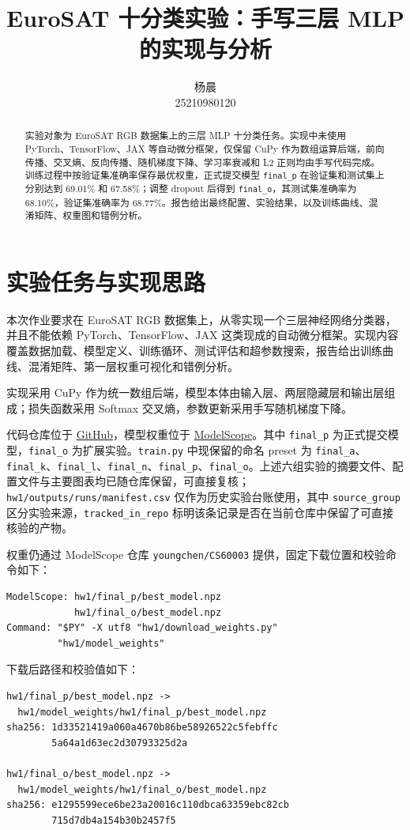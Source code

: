\documentclass[lang=cn,a4paper,newtx,code=minted]{elegantpaper}
\title{EuroSAT 十分类实验：手写三层 MLP 的实现与分析}
\author{杨晨 \\ 25210980120}
\institute{\href{https://github.com/YangChen-pro/CS60003}{GitHub 仓库}\quad|\quad\href{https://modelscope.cn/models/youngchen/CS60003/}{ModelScope 权重}}
\date{\zhdate{2026/04/18}}
\begin{document}
\maketitle

\begin{abstract}
实验对象为 EuroSAT RGB 数据集上的三层 MLP 十分类任务。实现中未使用 PyTorch、TensorFlow、JAX 等自动微分框架，仅保留 CuPy 作为数组运算后端，前向传播、交叉熵、反向传播、随机梯度下降、学习率衰减和 L2 正则均由手写代码完成。训练过程中按验证集准确率保存最优权重，正式提交模型 \texttt{final\_p} 在验证集和测试集上分别达到 69.01\% 和 67.58\%；调整 dropout 后得到 \texttt{final\_o}，其测试集准确率为 68.10\%，验证集准确率为 68.77\%。报告给出最终配置、实验结果，以及训练曲线、混淆矩阵、权重图和错例分析。
\end{abstract}

\section{实验任务与实现思路}

本次作业要求在 EuroSAT RGB 数据集上，从零实现一个三层神经网络分类器，并且不能依赖 PyTorch、TensorFlow、JAX 这类现成的自动微分框架。实现内容覆盖数据加载、模型定义、训练循环、测试评估和超参数搜索，报告给出训练曲线、混淆矩阵、第一层权重可视化和错例分析。

实现采用 CuPy 作为统一数组后端，模型本体由输入层、两层隐藏层和输出层组成；损失函数采用 Softmax 交叉熵，参数更新采用手写随机梯度下降。

代码仓库位于 \href{https://github.com/YangChen-pro/CS60003}{GitHub}，模型权重位于 \href{https://modelscope.cn/models/youngchen/CS60003/}{ModelScope}。其中 \texttt{final\_p} 为正式提交模型，\texttt{final\_o} 为扩展实验。\texttt{train.py} 中现保留的命名 preset 为 \texttt{final\_a}、\texttt{final\_k}、\texttt{final\_l}、\texttt{final\_n}、\texttt{final\_p}、\texttt{final\_o}。上述六组实验的摘要文件、配置文件与主要图表均已随仓库保留，可直接复核；\nolinkurl{hw1/outputs/runs/manifest.csv} 仅作为历史实验台账使用，其中 \texttt{source\_group} 区分实验来源，\texttt{tracked\_in\_repo} 标明该条记录是否在当前仓库中保留了可直接核验的产物。

权重仍通过 ModelScope 仓库 \texttt{youngchen/CS60003} 提供，固定下载位置和校验命令如下：
\begin{verbatim}
ModelScope: hw1/final_p/best_model.npz
            hw1/final_o/best_model.npz
Command: "$PY" -X utf8 "hw1/download_weights.py"
         "hw1/model_weights"
\end{verbatim}
下载后路径和校验值如下：
\begin{verbatim}
hw1/final_p/best_model.npz ->
  hw1/model_weights/hw1/final_p/best_model.npz
sha256: 1d33521419a060a4670b86be58926522c5febffc
        5a64a1d63ec2d30793325d2a

hw1/final_o/best_model.npz ->
  hw1/model_weights/hw1/final_o/best_model.npz
sha256: e1295599ece6be23a20016c110dbca63359ebc82cb
        715d7db4a154b30b2457f5
\end{verbatim}
\end{document}
